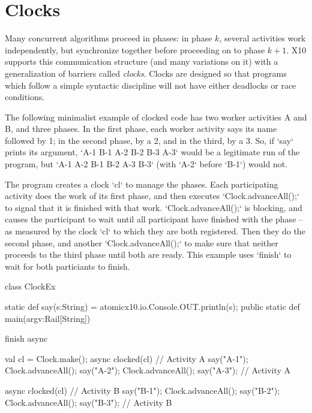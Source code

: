 \chapter{Clocks}\label{XtenClocks}

Many concurrent algorithms proceed in phases: in phase {$k$}, several
activities work independently, but synchronize together before proceeding on
to phase {$k+1$}. X10 supports this communication structure (and many
variations on it) with a generalization of barriers 
called {\em clocks}. Clocks are designed so that programs which follow a
simple syntactic discipline will not have either deadlocks or race conditions.


The following minimalist example of clocked code has two worker activities A
and B, and three phases. In the first phase, each worker activity says its
name followed by 1; in the second phase, by a 2, and in the third, by a 3.  
So, if \xcd`say` prints its argument, 
\xcd`A-1 B-1 A-2 B-2 B-3 A-3`
would be a legitimate run of the program, but
\xcd`A-1 A-2 B-1 B-2 A-3 B-3`
(with \xcd`A-2` before \xcd`B-1`) would not.

The program creates a clock \xcd`cl` to manage the phases.  Each participating
activity does
the work of its first phase, and then executes \xcd`Clock.advanceAll();` to
signal that it 
is finished with that work. \xcd`Clock.advanceAll();` is blocking, and causes the participant to
wait until all participant have finished with the phase -- as measured by the
clock \xcd`cl` to which they are both registered.  
Then they do the second phase, and another \xcd`Clock.advanceAll();` to make sure that
neither proceeds to the third phase until both are ready.  This example uses
\xcd`finish` to wait for both particiants to finish.  




\begin{xten}
class ClockEx {
  static def say(s:String) = 
     { atomic{x10.io.Console.OUT.println(s);} }
  public static def main(argv:Rail[String]) {
    finish async{
      val cl = Clock.make();
      async clocked(cl) {// Activity A
        say("A-1");
        Clock.advanceAll();
        say("A-2");
        Clock.advanceAll();
        say("A-3"); 
      }// Activity A

      async clocked(cl) {// Activity B
        say("B-1");
        Clock.advanceAll();
        say("B-2");
        Clock.advanceAll();
        say("B-3"); 
      }// Activity B
    }
  }
 }
\end{xten}

